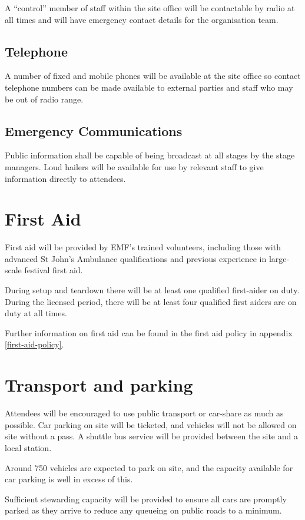 A ``control'' member of staff within the site office will be contactable by radio at all times and will
have emergency contact details for the organisation team.

\subsection{Telephone}
A number of fixed and mobile phones will be available at the site office so contact telephone numbers
can be made available to external parties and staff who may be out of radio range.

\subsection{Emergency Communications}
Public information shall be capable of being broadcast at all stages by the stage managers. Loud hailers will
be available for use by relevant staff to give information directly to attendees.

\section{First Aid}

First aid will be provided by EMF's trained volunteers, including those with advanced St John's Ambulance
qualifications and previous experience in large-scale festival first aid.

During setup and teardown there will be at least one qualified first-aider on duty. During the licensed period,
there will be at least four qualified first aiders are on duty at all times.

Further information on first aid can be found in the first aid policy in appendix \ref{first-aid-policy}.

\section{Transport and parking}

Attendees will be encouraged to use public transport or car-share as much as possible. Car parking on site will be ticketed,
and vehicles will not be allowed on site without a pass. A shuttle bus service will be provided between the site and a local station.

Around 750 vehicles are expected to park on site, and the capacity available for car parking is well in excess of this.

Sufficient stewarding capacity will be provided to ensure all cars are promptly parked as they arrive to reduce any queueing
on public roads to a minimum.

